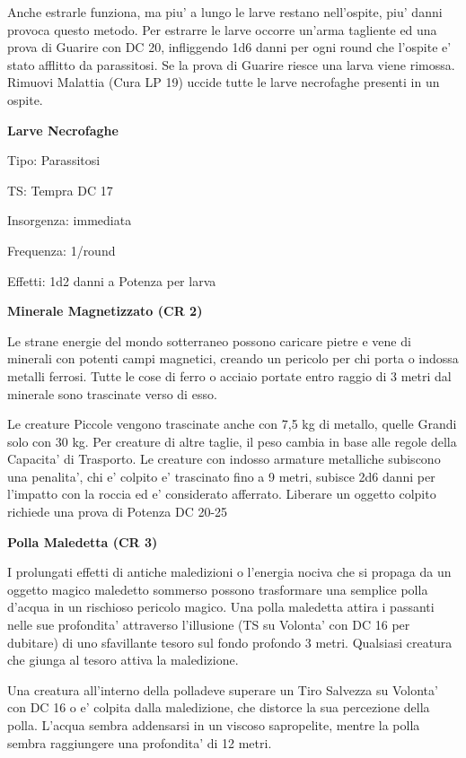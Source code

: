 \documentclass[a4paper,11pt,twoside,openany]{dndbook}
\begin{document}
Anche estrarle funziona, ma piu' a lungo le larve restano nell'ospite, piu' danni provoca questo metodo. Per estrarre le larve occorre un'arma tagliente ed una prova di Guarire con DC 20, infliggendo 1d6 danni per ogni round che l'ospite e' stato afflitto da parassitosi. Se la prova di Guarire riesce una larva viene rimossa. Rimuovi Malattia (Cura LP 19) uccide tutte le larve necrofaghe presenti in un ospite.

\textbf{Larve Necrofaghe}

Tipo: Parassitosi

TS: Tempra DC 17

Insorgenza: immediata

Frequenza: 1/round

Effetti: 1d2 danni a Potenza per larva

\textbf{Minerale Magnetizzato (CR 2)}

Le strane energie del mondo sotterraneo possono caricare pietre e vene di minerali con potenti campi magnetici, creando un pericolo per chi porta o indossa metalli ferrosi. Tutte le cose di ferro o acciaio portate entro raggio di 3 metri dal minerale sono trascinate verso di esso.

Le creature Piccole vengono trascinate anche con 7,5 kg di metallo, quelle Grandi solo con 30 kg. Per creature di altre taglie, il peso cambia in base alle regole della Capacita' di Trasporto. Le creature con indosso armature metalliche subiscono una penalita', chi e' colpito e' trascinato fino a 9 metri, subisce 2d6 danni per l'impatto con la roccia ed e' considerato afferrato. Liberare un oggetto colpito richiede una prova di Potenza DC 20-25

\textbf{Polla Maledetta (CR 3)}

I prolungati effetti di antiche maledizioni o l'energia nociva che si propaga da un oggetto magico maledetto sommerso possono trasformare una semplice polla d'acqua in un rischioso pericolo magico. Una polla maledetta attira i passanti nelle sue profondita' attraverso l'illusione (TS su Volonta' con DC 16 per dubitare) di uno sfavillante tesoro sul fondo profondo 3 metri. Qualsiasi creatura che giunga al tesoro attiva la maledizione.

Una creatura all'interno della polladeve superare un Tiro Salvezza su Volonta' con DC 16 o e' colpita dalla maledizione, che distorce la sua percezione della polla. L'acqua sembra addensarsi in un viscoso sapropelite, mentre la polla sembra raggiungere una profondita' di 12 metri.
\end{document}
